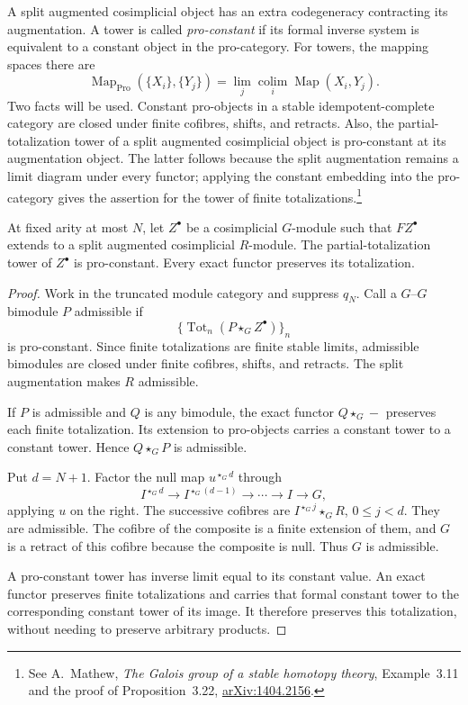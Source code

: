 A split augmented cosimplicial object has an extra codegeneracy
contracting its augmentation. A tower is called \emph{pro-constant}
if its formal inverse system is equivalent to a constant object
in the pro-category. For towers, the mapping spaces there are
\[
 \operatorname{Map}_{\operatorname{Pro}}(\{X_i\},\{Y_j\})
 =
 \lim_j\operatorname*{colim}_i\operatorname{Map}(X_i,Y_j).
\]
Two facts will be used. Constant pro-objects in a stable
idempotent-complete category are closed under finite cofibres,
shifts, and retracts. Also, the partial-totalization tower of a
split augmented cosimplicial object is pro-constant at its
augmentation object. The latter follows because the split
augmentation remains a limit diagram under every functor;
applying the constant embedding into the pro-category gives
the assertion for the tower of finite totalizations.\footnote{See
A.~Mathew, \emph{The Galois group of a stable homotopy theory},
Example~3.11 and the proof of Proposition~3.22,
\href{https://arxiv.org/abs/1404.2156}{arXiv:1404.2156}.}

\begin{lemma}\label{v4-lem:split-totalizations}
At fixed arity at most \(N\), let \(Z^\bullet\) be a
cosimplicial \(G\)-module such that \(FZ^\bullet\) extends to a
split augmented cosimplicial \(R\)-module.
The partial-totalization tower of \(Z^\bullet\) is pro-constant.
Every exact functor preserves its totalization.
\end{lemma}

\begin{proof}
Work in the truncated module category and suppress \(q_N\).
Call a \(G\)--\(G\) bimodule \(P\) admissible if
\[
 \{\operatorname{Tot}_n(P\star_G Z^\bullet)\}_n
\]
is pro-constant. Since finite totalizations are finite stable
limits, admissible bimodules are closed under finite cofibres,
shifts, and retracts. The split augmentation makes \(R\)
admissible.

If \(P\) is admissible and \(Q\) is any bimodule,
the exact functor \(Q\star_G-\) preserves each finite
totalization. Its extension to pro-objects carries a constant
tower to a constant tower. Hence \(Q\star_G P\) is admissible.

Put \(d=N+1\). Factor the null map \(u^{\star_G d}\) through
\[
 I^{\star_G d}\longrightarrow I^{\star_G(d-1)}
 \longrightarrow\cdots\longrightarrow I\longrightarrow G,
\]
applying \(u\) on the right.
The successive cofibres are
\(I^{\star_G j}\star_G R\), \(0\leq j<d\).
They are admissible. The cofibre of the composite is a finite
extension of them, and \(G\) is a retract of this cofibre because
the composite is null. Thus \(G\) is admissible.

A pro-constant tower has inverse limit equal to its constant
value. An exact functor preserves finite totalizations and
carries that formal constant tower to the corresponding
constant tower of its image. It therefore preserves this
totalization, without needing to preserve arbitrary products.
\end{proof}

